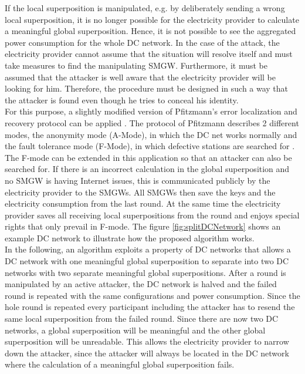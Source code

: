 If the local superposition is manipulated, e.g. by deliberately sending a wrong local superposition, it is no longer possible for the electricity provider to calculate a meaningful global superposition. Hence, it is not possible to see the aggregated power consumption for the whole DC network. In the case of the attack, the electricity provider cannot assume that the situation will resolve itself and must take measures to find the manipulating \gls{SMGW}. Furthermore, it must be assumed that the attacker is well aware that the electricity provider will be looking for him. Therefore, the procedure must be designed in such a way that the attacker is found even though he tries to conceal his identity.\\
For this purpose, a slightly modified version of Pfitzmann's error localization and recovery protocol can be applied \cite{pfitzmann2006security}. The protocol of Pfitzmann describes 2 different modes, the anonymity mode (A-Mode), in which the DC net works normally and the fault tolerance mode (F-Mode), in which defective stations are searched for .
The F-mode can be extended in this application so that an attacker can also be searched for. If there is an incorrect calculation in the global superposition and no \gls{SMGW} is having Internet issues, this is communicated publicly by the electricity provider to the \gls{SMGW}s. All \gls{SMGW}s then save the keys and the electricity consumption from the last round. At the same time the electricity provider saves all receiving local superpositions from the round and enjoys special rights that only prevail in F-mode. The figure \ref{fig:splitDCNetwork} shows an example DC network to illustrate how the proposed algorithm works.\\
In the following, an algorithm exploits a property of DC networks that allows a DC network with one meaningful global superposition to separate into two DC networks with two separate meaningful global superpositions.
After a round is manipulated by an active attacker, the DC network is halved and the failed round is repeated with the same configurations and power consumption. Since the hole round is repeated every participant including the attacker has to resend the same local superposition from the failed round. Since there are now two DC networks, a global superposition will be meaningful and the other global superposition will be unreadable. 
This allows the electricity provider to narrow down the attacker, since the attacker will always be located in the DC network where the calculation of a meaningful global superposition fails.\\
